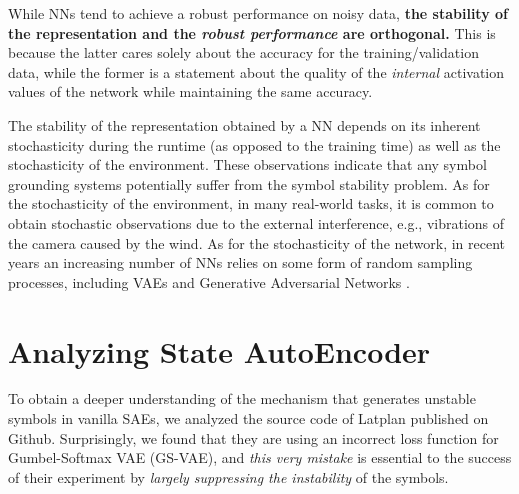 
While NNs tend to achieve a robust performance on noisy data,
\textbf{the stability of the representation and the \emph{robust performance} are orthogonal.}
This is because the latter cares solely about the accuracy for the training/validation data,
while the former is a statement about the quality of the \emph{internal} activation values of the network
while maintaining the same accuracy.


The stability of the representation obtained by a NN depends
on
its inherent stochasticity during the runtime (as opposed to the training time) as well as
the stochasticity of the environment.
% 
These observations indicate that any symbol grounding systems potentially suffer from 
the symbol stability problem.
% 
As for the stochasticity of the environment,
in many real-world tasks, it is common to obtain stochastic observations
due to the external interference, e.g., vibrations of the camera caused by the wind.
% 
As for the stochasticity of the network,
in recent years
an increasing number of NNs relies on some form of random
sampling processes, including VAEs
\cite{kingma2013auto,jang2016categorical,higgins2016beta}
and Generative Adversarial Networks \cite[GAN]{goodfellow2014generative}.

\section{Analyzing State AutoEncoder}
\label{analysis}

To obtain a deeper understanding of the mechanism that generates
unstable symbols in vanilla SAEs, we
analyzed the source code of Latplan published on Github.
% 
Surprisingly, we found that they are using an incorrect loss function for Gumbel-Softmax VAE (GS-VAE),
and \emph{this very mistake} is essential to the success of their experiment
by \emph{largely suppressing the instability} of the symbols.

 
